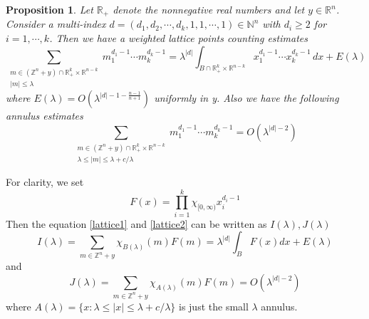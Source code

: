 \documentclass[10pt]{amsart}
\newtheorem{proposition}[theorem]{Proposition}
\newcommand{\R}{{\mathbb R}}
\newcommand{\1}{\mathbb{1}}
\newcommand{\Z}{{\mathbb Z}}
\newcommand{\N}{{\mathbb N}}
\begin{document}
\begin{proposition}\label{Weightedlattice}
    Let $\R_{+}$ denote the nonnegative real numbers and let $y\in \R^n$. Consider a multi-index $d = (d_1,d_2,\cdots,d_k,1,1,\cdots,1) \in \N^n$ with $d_i \geq 2$ for $i = 1,\cdots,k$. Then we have a weighted lattice points counting estimates
    \begin{equation}\label{lattice1}
        \sum_{\substack{m \in (\Z^n + y) \cap \R^k_+ \times\R^{n-k} \\ |m| \leq \lambda}} m_1^{d_1-1} \cdots m_k^{d_k - 1} = \lambda^{|d|} \int_{B \cap \R^k_+ \times \R^{n-k}} x_1^{d_1-1} \cdots x_k^{d_k-1} \, dx + E(\lambda)
    \end{equation}
    where $E(\lambda) = O( \lambda^{|d|-1-\frac{n-1}{n+1}})$ uniformly in y. Also we have the following annulus estimates 
    \begin{equation}\label{lattice2}
        \sum_{\substack{m \in (\Z^n + y) \cap \R^k_+ \times\R^{n-k} \\ \lambda \leq |m| \leq \lambda +c/\lambda}} m_1^{d_1-1} \cdots m_k^{d_k - 1} = O(\lambda^{|d| - 2})
    \end{equation}
\end{proposition}

    For clarity, we set
    \[
    F(x) = \prod_{i=1}^k \chi_{[0,\infty)} x_i^{d_i-1}
    \]
    Then the equation \ref{lattice1} and \ref{lattice2} can be written as $I(\lambda),J(\lambda)$
    \[
    I(\lambda) = \sum_{m \in \Z^n + y } \chi_{B(\lambda)}(m)F(m) = \lambda^{|d|}\int_B F(x)dx +E(\lambda)
    \]
    and 
    \[
    J(\lambda) = \sum_{m \in \Z^n + y } \chi_{A(\lambda)}(m)F(m) = O(\lambda^{|d|-2})
    \]
    where $A(\lambda) = \{x: \lambda \leq |x| \leq \lambda +c/\lambda\}$ is just the small $\lambda$ annulus.
\end{document}
